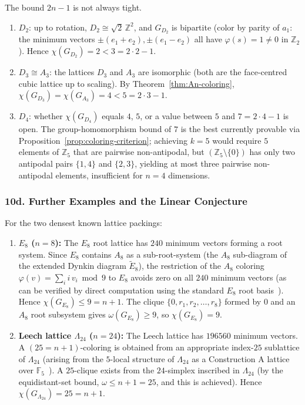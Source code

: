 \begin{remark}
The bound $2n-1$ is not always tight.
\begin{enumerate}
  \item[\textup{(a)}] $D_2$: up to rotation, $D_2 \cong \sqrt{2}\,\mathbb{Z}^2$, and $G_{D_2}$ is bipartite (color by parity of $a_1$: the minimum vectors $\pm(e_1+e_2), \pm(e_1-e_2)$ all have $\varphi(s) = 1 \neq 0$ in $\mathbb{Z}_2$).  Hence $\chi(G_{D_2}) = 2 < 3 = 2\cdot 2-1$.
  \item[\textup{(b)}] $D_3 \cong A_3$: the lattices $D_3$ and $A_3$ are isomorphic (both are the face-centred cubic lattice up to scaling).  By Theorem~\ref{thm:An-coloring}, $\chi(G_{D_3}) = \chi(G_{A_3}) = 4 < 5 = 2\cdot 3-1$.
  \item[\textup{(c)}] $D_4$: whether $\chi(G_{D_4})$ equals $4$, $5$, or a value between $5$ and $7 = 2\cdot 4-1$ is open.  The group-homomorphism bound of $7$ is the best currently provable via Proposition~\ref{prop:coloring-criterion}; achieving $k=5$ would require $5$ elements of $\mathbb{Z}_5$ that are pairwise non-antipodal, but $(\mathbb{Z}_5\setminus\{0\})$ has only two antipodal pairs $\{1,4\}$ and $\{2,3\}$, yielding at most three pairwise non-antipodal elements, insufficient for $n=4$ dimensions.
\end{enumerate}
\end{remark}

\subsubsection*{10d. Further Examples and the Linear Conjecture}

\begin{remark}\label{rem:optimal-lattices}
For the two densest known lattice packings:
\begin{enumerate}
  \item[\textup{(a)}] \textbf{$E_8$ ($n=8$):}  The $E_8$ root lattice has $240$ minimum vectors forming a root system.  Since $E_8$ contains $A_8$ as a sub-root-system (the $A_8$ sub-diagram of the extended Dynkin diagram $\widetilde{E}_8$), the restriction of the $A_8$ coloring $\varphi(v) = \sum_i i\,v_i \bmod 9$ to $E_8$ avoids zero on all $240$ minimum vectors (as can be verified by direct computation using the standard $E_8$ root basis~\cite{BvM2022}).  Hence $\chi(G_{E_8}) \le 9 = n+1$.  The clique $\{0, r_1, r_2, \ldots, r_8\}$ formed by $0$ and an $A_8$ root subsystem gives $\omega(G_{E_8}) \ge 9$, so $\chi(G_{E_8}) = 9$.
  \item[\textup{(b)}] \textbf{Leech lattice $\Lambda_{24}$ ($n=24$):}  The Leech lattice has $196560$ minimum vectors.  A $(25 = n+1)$-coloring is obtained from an appropriate index-$25$ sublattice of $\Lambda_{24}$ (arising from the $5$-local structure of $\Lambda_{24}$ as a Construction A lattice over $\mathbb{F}_5$~\cite{PT1984}).  A $25$-clique exists from the $24$-simplex inscribed in $\Lambda_{24}$ (by the equidistant-set bound, $\omega \le n+1 = 25$, and this is achieved).  Hence $\chi(G_{\Lambda_{24}}) = 25 = n+1$.
\end{enumerate}
\end{remark}

